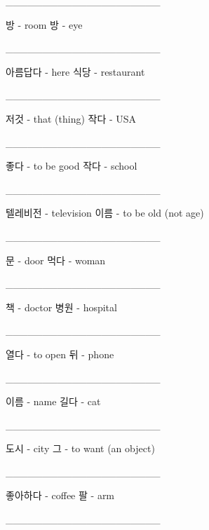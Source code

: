 \documentclass[addpoints, 30pt]{../exam}%
\begin{document}
\begin{questions}
\_\_\_\_\_\_\_\_\_\_\_\_\_\_\_\_\_\_\_\_\_%
\begin{choices}%
\CorrectChoice%
방 {-} room%
\choice%
방 {-} eye%
\end{choices}%
\question[1]%
\_\_\_\_\_\_\_\_\_\_\_\_\_\_\_\_\_\_\_\_\_%
\begin{choices}%
\choice%
아름답다 {-} here%
\CorrectChoice%
식당 {-} restaurant%
\end{choices}%
\question[1]%
\_\_\_\_\_\_\_\_\_\_\_\_\_\_\_\_\_\_\_\_\_%
\begin{choices}%
\CorrectChoice%
저것 {-} that (thing)%
\choice%
작다 {-} USA%
\end{choices}%
\question[1]%
\_\_\_\_\_\_\_\_\_\_\_\_\_\_\_\_\_\_\_\_\_%
\begin{choices}%
\CorrectChoice%
좋다 {-} to be good%
\choice%
작다 {-} school%
\end{choices}%
\question[1]%
\_\_\_\_\_\_\_\_\_\_\_\_\_\_\_\_\_\_\_\_\_%
\begin{choices}%
\CorrectChoice%
텔레비전 {-} television%
\choice%
이름 {-} to be old (not age)%
\end{choices}%
\question[1]%
\_\_\_\_\_\_\_\_\_\_\_\_\_\_\_\_\_\_\_\_\_%
\begin{choices}%
\CorrectChoice%
문 {-} door%
\choice%
먹다 {-} woman%
\end{choices}%
\question[1]%
\_\_\_\_\_\_\_\_\_\_\_\_\_\_\_\_\_\_\_\_\_%
\begin{choices}%
\choice%
책 {-} doctor%
\CorrectChoice%
병원 {-} hospital%
\end{choices}%
\question[1]%
\_\_\_\_\_\_\_\_\_\_\_\_\_\_\_\_\_\_\_\_\_%
\begin{choices}%
\CorrectChoice%
열다 {-} to open%
\choice%
뒤 {-} phone%
\end{choices}%
\question[1]%
\_\_\_\_\_\_\_\_\_\_\_\_\_\_\_\_\_\_\_\_\_%
\begin{choices}%
\CorrectChoice%
이름 {-} name%
\choice%
길다 {-} cat%
\end{choices}%
\question[1]%
\_\_\_\_\_\_\_\_\_\_\_\_\_\_\_\_\_\_\_\_\_%
\begin{choices}%
\CorrectChoice%
도시 {-} city%
\choice%
그 {-} to want (an object)%
\end{choices}%
\question[1]%
\_\_\_\_\_\_\_\_\_\_\_\_\_\_\_\_\_\_\_\_\_%
\begin{choices}%
\choice%
좋아하다 {-} coffee%
\CorrectChoice%
팔 {-} arm%
\end{choices}%
\question[1]%
\_\_\_\_\_\_\_\_\_\_\_\_\_\_\_\_\_\_\_\_\_%
\begin{choices}%

\end{choices}
\end{questions}
\end{document}
